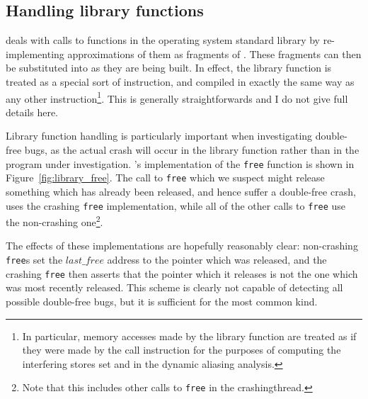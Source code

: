 \subsection{Handling library functions}
\label{sect:derive:library_functions}

{\Implementation} deals with calls to functions in the operating
system standard library by re-implementing approximations of them as
fragments of {\StateMachine}.  These fragments can then be substituted
into {\StateMachines} as they are being built.  In effect, the library
function is treated as a special sort of instruction, and compiled in
exactly the same way as any other instruction\footnote{In particular,
  memory accesses made by the library function are treated as if they
  were made by the call instruction for the purposes of computing the
  interfering stores set and in the dynamic aliasing analysis.}.  This
is generally straightforwards and I do not give full details here.

Library function handling is particularly important when investigating
double-free bugs, as the actual crash will occur in the library
function rather than in the program under investigation.
{\Technique}'s implementation of the \texttt{free} function is shown
in Figure~\ref{fig:library_free}.  The call to \texttt{free} which we
suspect might release something which has already been released, and
hence suffer a double-free crash, uses the crashing \texttt{free}
implementation, while all of the other calls to \texttt{free} use the
non-crashing one\footnote{Note that this includes other calls to
  \texttt{free} in the \gls{crashingthread}.}.

The effects of these implementations are hopefully reasonably clear:
non-crashing \texttt{free}s set the $\mathit{last\_free}$ address to
the pointer which was released, and the crashing \texttt{free} then
asserts that the pointer which it releases is not the one which was
most recently released.  This scheme is clearly not capable of
detecting all possible double-free bugs, but it is sufficient for the
most common kind.

